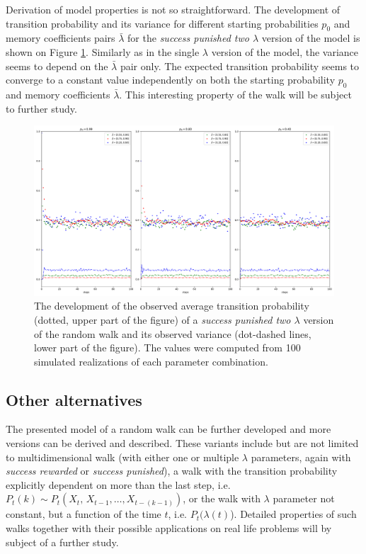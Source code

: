 \documentclass{amsart}
\theoremstyle{definition}
\theoremstyle{plain}
\theoremstyle{plain}
\theoremstyle{plain}
\numberwithin{equation}{section}
\begin{document}
Derivation of model properties is not so straightforward. The development
of transition probability and its variance for different starting
probabilities $p_{0}$ and memory coefficients pairs $\bar{\lambda}$
for the \emph{success punished two $\lambda$ }version of the model
is shown on Figure \ref{fig:Development-punish2l}. Similarly as in
the single $\lambda$ version of the model, the variance seems to
depend on the $\bar{\lambda}$ pair only. The expected transition
probability seems to converge to a constant value independently on
both the starting probability $p_{0}$ and memory coefficients $\bar{\lambda}$.
This interesting property of the walk will be subject to further study.

\begin{figure}
 \begin{center}
\includegraphics[width=1\textwidth]{../simulations/ept_100_walks_100_steps_type_success_punished_two_lambdas}
\caption{\label{fig:Development-punish2l}The development of the observed average
transition probability (dotted, upper part of the figure) of a \emph{success
punished two $\lambda$ }version of the random walk and its observed
variance (dot-dashed lines, lower part of the figure). The values
were computed from 100 simulated realizations of each parameter
combination.}
 \end{center}
\end{figure}


\subsection{Other alternatives}

The presented model of a random walk can be further developed and
more versions can be derived and described. These variants include
but are not limited to multidimensional walk (with either one or multiple
$\lambda$ parameters, again with \emph{success rewarded }or \emph{success
punished}), a walk with the transition probability explicitly dependent
on more than the last step, i.e. $P_{t}(k)\sim P_{t}(X_{t},\,X_{t-1},\dots,X_{t-(k-1)})$,
or the walk with $\lambda$ parameter not constant, but a function
of the time $t$, i.e. $P_{t}(\lambda(t)$). Detailed properties of
such walks together with their possible applications on real life
problems will by subject of a further study.
\end{document}
